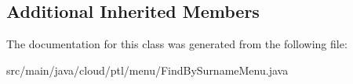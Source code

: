 \subsection*{Additional Inherited Members}


The documentation for this class was generated from the following file\+:\begin{DoxyCompactItemize}
\item 
src/main/java/cloud/ptl/menu/Find\+By\+Surname\+Menu.\+java\end{DoxyCompactItemize}
